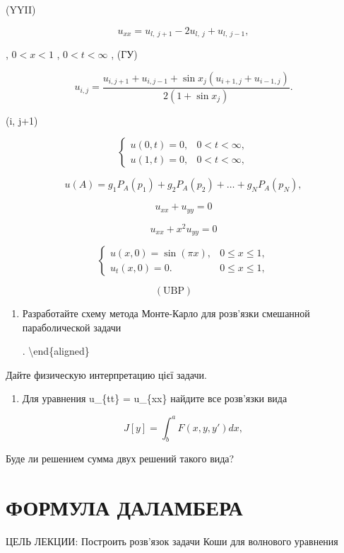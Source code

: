 \documentclass[
  ukrainian,
]{article}
\providecommand{\tightlist}{%
  \setlength{\itemsep}{0pt}\setlength{\parskip}{0pt}}
\begin{document}
(YYII)

\[
u_{xx}=u_{l,\ j+1}-2u_{l,\ j}+u_{l,\ j-1},
\]

, \(0 < x < 1\) , \(0 < t < \infty\) , (ГУ)

\[
u_{i, j} = \frac{u_{i, j+1} + u_{i, j-1} + \sin x_j (u_{i+1, j} + u_{i-1, j})}{2 (1 + \sin x_j)}.
\]

(i, j+1)

\[
\begin{cases} u(0, t) = 0, & 0 < t < \infty, \\ u(1, t) = 0, & 0 < t < \infty, \end{cases}
\]

\[
u(A) = g_1 P_A(p_1) + g_2 P_A(p_2) + \dots + g_N P_A(p_N),
\]

\[
u_{xx} + u_{yy} = 0
\]

\[
u_{xx} + x^2 u_{yy} = 0
\]

\[
\begin{cases} u(x, 0) = \sin(\pi x), & 0 \le x \le 1, \\ u_t(x, 0) = 0. & 0 \le x \le 1, \end{cases}
\]

\[
(\text{UBP}) \qquad
\]

\begin{enumerate}
\def\labelenumi{\arabic{enumi}.}
\setcounter{enumi}{4}
\item
  Разработайте схему метода Монте-Карло для розв'язки смешанной
  параболической задачи

  \right. \textbackslash end\{aligned\}
\end{enumerate}

Дайте физическую интерпретацию цієї задачи.

\begin{enumerate}
\def\labelenumi{\arabic{enumi}.}
\setcounter{enumi}{3}
\tightlist
\item
  Для уравнения u\_\{tt\} = u\_\{xx\} найдите все розв'язки вида
\end{enumerate}

\[
J[y] = \int_{b}^{a} F(x, y, y') dx,
\]

Буде ли решением сумма двух решений такого вида?

\section{ФОРМУЛА
ДАЛАМБЕРА}\label{ux444ux43eux440ux43cux443ux43bux430-ux434ux430ux43bux430ux43cux431ux435ux440ux430}

ЦЕЛЬ ЛЕКЦИИ: Построить розв'язок задачи Коши для волнового уравнения
\end{document}
